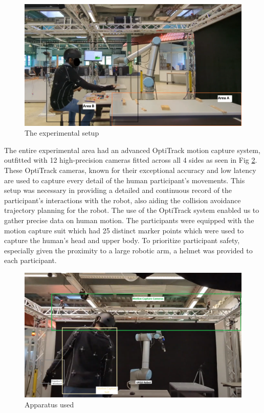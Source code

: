 \begin{figure}[h] 

    \centering 

    \includegraphics[width=0.8\columnwidth]{images/Setup.png} 

    \caption{The experimental setup} 

    \label{fig:setup} 

\end{figure} 





The entire experimental area had an advanced OptiTrack motion capture system, outfitted with 12 high-precision cameras fitted across all 4 sides as seen in Fig \ref{fig:apparatus}. These OptiTrack cameras, known for their exceptional accuracy and low latency are used to capture every detail of the human participant's movements. This setup was necessary in providing a detailed and continuous record of the participant's interactions with the robot, also aiding the collision avoidance trajectory planning for the robot. The use of the OptiTrack system enabled us to gather precise data on human motion. The participants were equipped with the motion capture suit which had 25 distinct marker points which were used to capture the human's head and upper body. To prioritize participant safety, especially given the proximity to a large robotic arm, a helmet was provided to each participant.

\begin{figure}[hb]
	\centering
	\includegraphics[width=0.8\columnwidth]{images/apparatus.png}
	\caption{Apparatus used}
	\label{fig:apparatus}
\end{figure}

